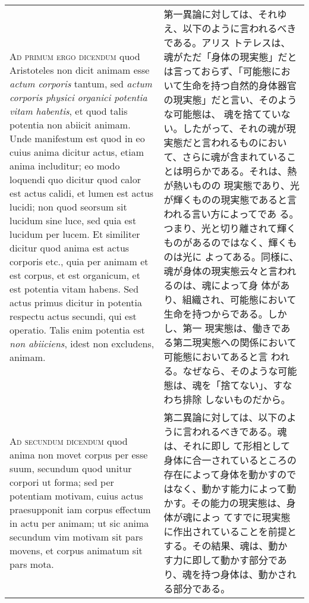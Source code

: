 \documentclass[paper=a4paper,fontsize=10pt,jafontsize=9pt,titlepage]{jlreq}
\begin{document}
\begin{longtable}{p{21em}p{21em}}
\\


{\scshape Ad primum ergo dicendum} quod Aristoteles non dicit animam
esse {\itshape actum corporis} tantum, sed {\itshape actum corporis
physici organici potentia vitam habentis}, et quod talis potentia non
abiicit animam. Unde manifestum est quod in eo cuius anima dicitur
actus, etiam anima includitur; eo modo loquendi quo dicitur quod calor
est actus calidi, et lumen est actus lucidi; non quod seorsum sit
lucidum sine luce, sed quia est lucidum per lucem. Et similiter
dicitur quod anima est actus corporis etc., quia per animam et est
corpus, et est organicum, et est potentia vitam habens. Sed actus
primus dicitur in potentia respectu actus secundi, qui est
operatio. Talis enim potentia est {\itshape non abiiciens}, idest non
excludens, animam.

&

 第一異論に対しては、それゆえ、以下のように言われるべきである。アリス
 トテレスは、魂がただ「身体の現実態」だとは言っておらず、「可能態にお
 いて生命を持つ自然的身体器官の現実態」だと言い、そのような可能態は、
 魂を捨てていない。したがって、それの魂が現実態だと言われるものにおい
 て、さらに魂が含まれていることは明らかである。それは、熱が熱いものの
 現実態であり、光が輝くものの現実態であると言われる言い方によってであ
 る。つまり、光と切り離されて輝くものがあるのではなく、輝くものは光に
 よってある。同様に、魂が身体の現実態云々と言われるのは、魂によって身
 体があり、組織され、可能態において生命を持つからである。しかし、第一
 現実態は、働きである第二現実態への関係において可能態においてあると言
 われる。なぜなら、そのような可能態は、魂を「捨てない」、すなわち排除
 しないものだから。
 
 
\\


{\scshape Ad secundum dicendum} quod anima non movet corpus per esse
suum, secundum quod unitur corpori ut forma; sed per potentiam
motivam, cuius actus praesupponit iam corpus effectum in actu per
animam; ut sic anima secundum vim motivam sit pars movens, et corpus
animatum sit pars mota.

&

 第二異論に対しては、以下のように言われるべきである。魂は、それに即し
 て形相として身体に合一されているところの存在によって身体を動かすので
 はなく、動かす能力によって動かす。その能力の現実態は、身体が魂によっ
 てすでに現実態に作出されていることを前提とする。その結果、魂は、動か
 す力に即して動かす部分であり、魂を持つ身体は、動かされる部分である。
 

\end{longtable}
\end{document}
